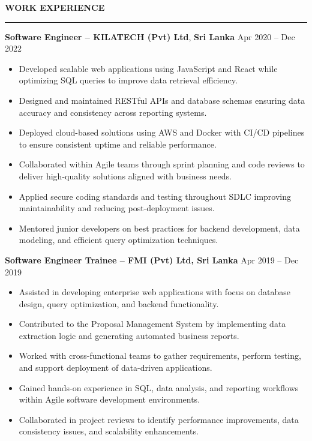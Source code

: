 \documentclass[10pt,letterpaper]{article}
\begin{document}
\textbf{WORK EXPERIENCE}\\[-8pt]
\noindent\rule{\textwidth}{1pt}

\vspace{-2pt}

\textbf{Software Engineer -- KILATECH (Pvt) Ltd}, \textbf{Sri Lanka} \hfill Apr 2020 -- Dec 2022

\vspace{-1pt}

\begin{itemize}
\item Developed scalable web applications using JavaScript and React while optimizing SQL queries to improve data retrieval efficiency.
\item Designed and maintained RESTful APIs and database schemas ensuring data accuracy and consistency across reporting systems.
\item Deployed cloud-based solutions using AWS and Docker with CI/CD pipelines to ensure consistent uptime and reliable performance.
\item Collaborated within Agile teams through sprint planning and code reviews to deliver high-quality solutions aligned with business needs.
\item Applied secure coding standards and testing throughout SDLC improving maintainability and reducing post-deployment issues.
\item Mentored junior developers on best practices for backend development, data modeling, and efficient query optimization techniques.
\end{itemize}

\textbf{Software Engineer Trainee -- FMI (Pvt) Ltd, Sri Lanka} \hfill Apr 2019 -- Dec 2019

\vspace{-1pt}

\begin{itemize}
\item Assisted in developing enterprise web applications with focus on database design, query optimization, and backend functionality.
\item Contributed to the Proposal Management System by implementing data extraction logic and generating automated business reports.
\item Worked with cross-functional teams to gather requirements, perform testing, and support deployment of data-driven applications.
\item Gained hands-on experience in SQL, data analysis, and reporting workflows within Agile software development environments.
\item Collaborated in project reviews to identify performance improvements, data consistency issues, and scalability enhancements.
\end{itemize}
\end{document}
